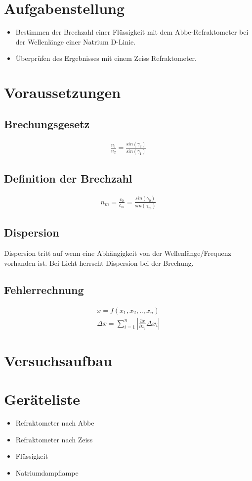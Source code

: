 \documentclass[a4paper]{article}
\begin{document}
\section{Aufgabenstellung}
\begin{itemize}
  \item Bestimmen der Brechzahl einer Flüssigkeit mit dem Abbe-Refraktometer bei der Wellenlänge einer Natrium D-Linie.
  \item Überprüfen des Ergebnisses mit einem Zeiss Refraktometer.
\end{itemize}

\section{Voraussetzungen}
  \subsection{Brechungsgesetz}
\begin{align}
  \frac{n_1}{n_2}=\frac{sin(\gamma_2)}{sin(\gamma_1)}
  \label{bechungsgesetz}
\end{align}
  \subsection{Definition der Brechzahl}
  \begin{align}
    n_m = \frac{c_0}{c_m}=\frac{sin(\gamma_0)}{sin(\gamma_m)}
    \label{brechzahl}
  \end{align}
  \subsection{Dispersion}
  Dispersion tritt auf wenn eine Abhängigkeit von der Wellenlänge/Frequenz vorhanden ist. Bei Licht herrscht Dispersion bei der Brechung.
  \subsection{Fehlerrechnung}
  \begin{align}
    x=f(x_1,x_2,..,x_n)\\
    \Delta x = \sum_{i=1}^n{\left |\frac{\partial  x}{\partial x_i}\Delta x_i\right |}
    \label{error}
  \end{align}

\section{Versuchsaufbau}
\section{Geräteliste}
\begin{itemize}
  \item Refraktometer nach Abbe 
  \item Refraktometer nach Zeiss
  \item Flüssigkeit
  \item Natriumdampflampe
\end{itemize}
\end{document}
